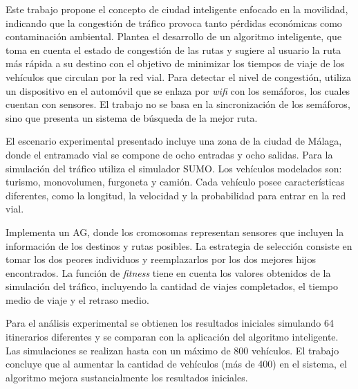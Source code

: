 \begin{itemize}
\begin{item}

Este trabajo propone el concepto de ciudad inteligente enfocado en la movilidad, indicando que la congestión de tráfico provoca tanto pérdidas económicas como contaminación ambiental. Plantea el desarrollo de un algoritmo inteligente, que toma en cuenta el estado de congestión de las rutas y sugiere al usuario la ruta más rápida a su destino con el objetivo de minimizar los tiempos de viaje de los vehículos que circulan por la red vial. Para detectar el nivel de congestión, utiliza un dispositivo en el automóvil que se enlaza por \emph{wifi} con los semáforos, los cuales cuentan con sensores. El trabajo no se basa en la sincronización de los semáforos, sino que presenta un sistema de búsqueda de la mejor ruta.

El escenario experimental presentado incluye una zona de la ciudad de Málaga, donde el entramado vial se compone de ocho entradas y ocho salidas. Para la simulación del tráfico utiliza el simulador SUMO. Los vehículos modelados son: turismo, monovolumen, furgoneta y camión. Cada vehículo posee características diferentes, como la longitud, la velocidad y la probabilidad para entrar en la red vial.

Implementa un AG, donde los cromosomas representan sensores que incluyen la información de los destinos y rutas posibles. La estrategia de selección consiste en tomar los dos peores individuos y reemplazarlos por los dos mejores hijos encontrados. La función de \emph{fitness} tiene en cuenta los valores obtenidos de la simulación del tráfico, incluyendo la cantidad de viajes completados, el tiempo medio de viaje y el retraso medio. 

Para el análisis experimental se obtienen los resultados iniciales simulando 64 itinerarios diferentes y se comparan con la aplicación del algoritmo inteligente. Las simulaciones se realizan hasta con un máximo de 800 vehículos. El trabajo concluye que al aumentar la cantidad de vehículos (más de 400) en el sistema, el algoritmo mejora sustancialmente los resultados iniciales.

\end{item}	


\begin{item}


\end{item}
\end{itemize}
